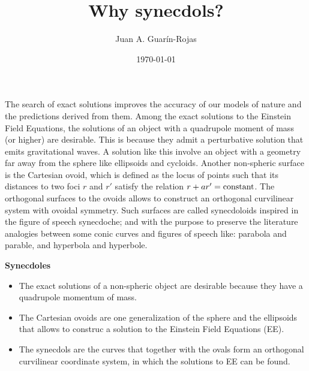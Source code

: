 \documentclass[11pt]{article}
\begin{document}
\title{Why synecdols?}
\author{Juan A. Guarín-Rojas}
\date{\today}
\maketitle

The search of exact solutions improves the accuracy of our models of nature and the predictions derived from them. Among the exact solutions to the Einstein Field Equations, the solutions of an object with a quadrupole moment of mass (or higher) are desirable. This is because they admit a perturbative solution that emits gravitational waves. A solution like this involve an object with a geometry far away from the sphere like ellipsoids and cycloids. Another non-spheric surface is the Cartesian ovoid, which is defined as the locus of points such that its distances to two foci $r$ and $r'$ satisfy the relation $r+ar'=\rm{constant}$. The orthogonal surfaces to the ovoids allows to construct an orthogonal curvilinear system with ovoidal symmetry. Such surfaces are called synecdoloids inspired in the figure of speech synecdoche; and with the purpose to preserve the literature analogies between some conic curves and figures of speech like: parabola and parable, and hyperbola and hyperbole.

\textbf{Synecdoles}

\begin{itemize}
	\item The exact solutions of a non-spheric object are desirable because they have a quadrupole momentum of mass.
	\item The Cartesian ovoids are one generalization of the sphere and the ellipsoids that allows to construc a solution to the Einstein Field Equations (EE).
	\item The synecdols are the curves that together with the ovals form an orthogonal curvilinear coordinate system, in which the solutions to EE can be found.
\end{itemize}
\end{document}
